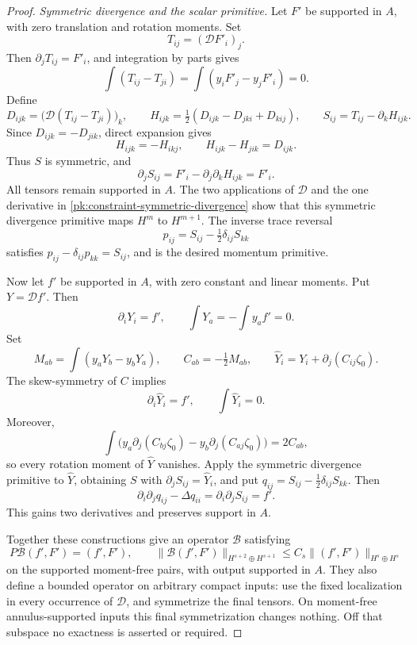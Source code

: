 \begin{proof}
\smallskip
\emph{Symmetric divergence and the scalar primitive.}
Let \(F'\) be supported in \(A\), with zero translation and rotation
moments.  Set
\[
 T_{ij}=(\mathcal DF'_i)_j.
\]
Then \(\partial_jT_{ij}=F'_i\), and integration by parts gives
\[
 \int(T_{ij}-T_{ji})
       =\int(y_iF'_j-y_jF'_i)=0.
\]
Define
\begin{equation}
 D_{ijk}=\bigl(\mathcal D(T_{ij}-T_{ji})\bigr)_k,\qquad
 H_{ijk}=\tfrac12(D_{ijk}-D_{jki}+D_{kij}),\qquad
 S_{ij}=T_{ij}-\partial_kH_{ijk}.
 \label{pk:constraint-symmetric-divergence}
\end{equation}
Since \(D_{ijk}=-D_{jik}\), direct expansion gives
\[
 H_{ijk}=-H_{ikj},\qquad H_{ijk}-H_{jik}=D_{ijk}.
\]
Thus \(S\) is symmetric, and
\[
 \partial_jS_{ij}
  =F'_i-\partial_j\partial_kH_{ijk}=F'_i.
\]
All tensors remain supported in \(A\).  The two applications of
\(\mathcal D\) and the one derivative in
\eqref{pk:constraint-symmetric-divergence} show that this symmetric
divergence primitive maps \(H^m\) to \(H^{m+1}\).
The inverse trace reversal
\[
 p_{ij}=S_{ij}-\tfrac12\delta_{ij}S_{kk}
\]
satisfies \(p_{ij}-\delta_{ij}p_{kk}=S_{ij}\), and is the desired
momentum primitive.

Now let \(f'\) be supported in \(A\), with zero constant and linear
moments.  Put \(Y=\mathcal Df'\).  Then
\[
 \partial_iY_i=f',\qquad
 \int Y_a=-\int y_af'=0.
\]
Set
\[
 M_{ab}=\int(y_aY_b-y_bY_a),\qquad
 C_{ab}=-\tfrac12M_{ab},\qquad
 \widehat Y_i=Y_i+\partial_j(C_{ij}\zeta_0).
\]
The skew-symmetry of \(C\) implies
\[
 \partial_i\widehat Y_i=f',\qquad \int\widehat Y_i=0.
\]
Moreover,
\[
 \int\bigl(y_a\partial_j(C_{bj}\zeta_0)
              -y_b\partial_j(C_{aj}\zeta_0)\bigr)=2C_{ab},
\]
so every rotation moment of \(\widehat Y\) vanishes.
Apply the symmetric divergence primitive to \(\widehat Y\), obtaining
\(S\) with \(\partial_jS_{ij}=\widehat Y_i\), and put
\(q_{ij}=S_{ij}-\tfrac12\delta_{ij}S_{kk}\).  Then
\[
 \partial_i\partial_jq_{ij}-\Delta q_{ii}
    =\partial_i\partial_jS_{ij}=f'.
\]
This gains two derivatives and preserves support in \(A\).

Together these constructions give an operator \(\mathcal B\) satisfying
\begin{equation}
 P\mathcal B(f',F')=(f',F'),\qquad
 \|\mathcal B(f',F')\|_{H^{s+2}\oplus H^{s+1}}
    \leq C_s\|(f',F')\|_{H^s\oplus H^s}
 \label{pk:constraint-compact-primitive}
\end{equation}
on the supported moment-free pairs, with output supported in \(A\).
They also define a bounded operator on arbitrary compact inputs:
use the fixed localization in every occurrence of \(\mathcal D\),
and symmetrize the final tensors.  On moment-free annulus-supported
inputs this final symmetrization changes nothing.  Off that subspace
no exactness is asserted or required.


\end{proof}
